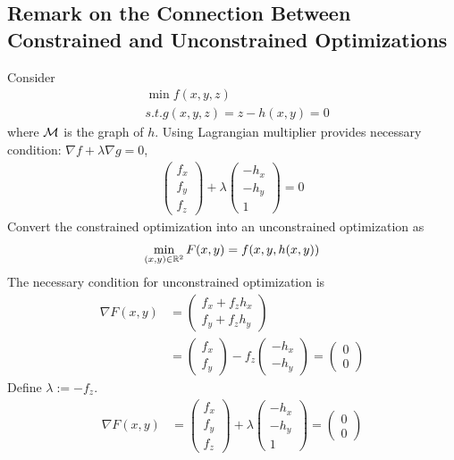 \documentclass{article}
\begin{document}
   	\subsection{Remark on the Connection Between Constrained and Unconstrained Optimizations}
   	\begin{example}
   		Consider
   		\begin{align}
   			&\min f(x,y,z) \\
   			&s.t. g(x,y,z) = z - h(x,y) = 0
   		\end{align}
   		where $\mathcal{{M}}$ is the graph of $h$. Using Lagrangian multiplier provides necessary condition: $\nabla f + \lambda \nabla g = 0$,
   		\begin{align}
   			\begin{pmatrix}
   				f_x \\ f_y \\ f_z
   			\end{pmatrix}
   			+ \lambda
   			\begin{pmatrix}
   				-h_x \\ -h_y \\ 1
   			\end{pmatrix} = 0
   		\end{align}
   		Convert the constrained optimization into an unconstrained optimization as 
   		\begin{align}
   			\min_{(x,y) \in \mathbb{R}^2} F(x, y) = f(x, y, h(x, y))
   		\end{align}
   		The necessary condition for unconstrained optimization is
   		\begin{align}
   			\nabla F(x, y) &= \begin{pmatrix}
   				f_x + f_z h_x \\
   				f_y + f_z h_y
   			\end{pmatrix} \\
   			&= \begin{pmatrix}
   				f_x \\ f_y
   			\end{pmatrix} - f_z \begin{pmatrix}
   				-h_x \\ -h_y
   			\end{pmatrix} = \begin{pmatrix}
   				0 \\ 0
   			\end{pmatrix}
   		\end{align}
   		Define $\lambda := -f_z$.
   		\begin{align}
   			\nabla F(x, y) &= \begin{pmatrix}
   				f_x \\ f_y \\ f_z
   			\end{pmatrix} + \lambda
   			\begin{pmatrix}
   				-h_x \\ -h_y \\ 1
   			\end{pmatrix} = \begin{pmatrix}
   				0 \\ 0
   			\end{pmatrix}
   		\end{align}
   	\end{example}
\end{document}
